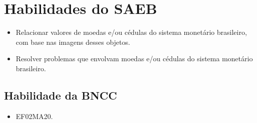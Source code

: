 \section*{Habilidades do SAEB}

\begin{itemize}
\item Relacionar valores de moedas e/ou cédulas do sistema monetário
brasileiro, com base nas imagens desses objetos.

\item Resolver problemas que envolvam moedas e/ou cédulas do sistema
monetário brasileiro.
\end{itemize}

\subsection{Habilidade da BNCC}

\begin{itemize}
\item EF02MA20.
\end{itemize}

